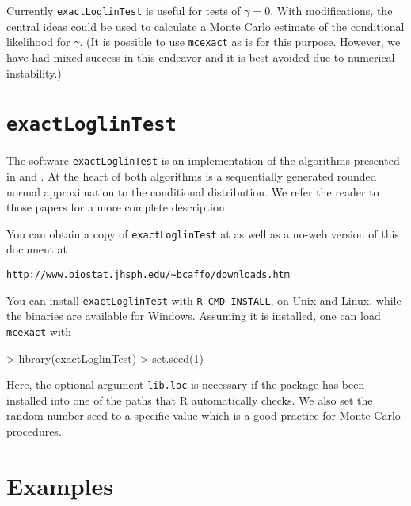 \documentclass[a4paper]{article}
\newcommand{\mcexact}{\texttt{mcexact} }
\begin{document}
Currently \texttt{exactLoglinTest} is useful for tests of $\gamma = 0$. With
modifications, the central ideas could be used to calculate a Monte
Carlo estimate of the conditional likelihood for $\gamma$. (It is
possible to use \mcexact as is for this purpose. However, we have had
mixed success in this endeavor and it is best avoided due to numerical
instability.)

\section{\texttt{exactLoglinTest}} 
The software \texttt{exactLoglinTest} is an implementation of the algorithms presented
in \cite{booth:butler:1999} and \cite{caffo:booth:2000}.  At the heart
of both algorithms is a sequentially generated rounded normal
approximation to the conditional distribution. We refer the reader
to those papers for a more complete description.

You can obtain a copy of \texttt{exactLoglinTest} at as well as a no-web \cite{leisch}
version of this document at
\begin{verbatim}
http://www.biostat.jhsph.edu/~bcaffo/downloads.htm
\end{verbatim}
You can install \texttt{exactLoglinTest} with \texttt{R CMD INSTALL}, on Unix and
Linux, while the binaries are available for Windows. Assuming it is
installed, one can load \mcexact with
\begin{Schunk}
\begin{Sinput}
> library(exactLoglinTest)
> set.seed(1)
\end{Sinput}
\end{Schunk}
Here, the optional argument \texttt{lib.loc} is necessary if
the package has been installed into one of the paths that R automatically
checks. We also set the random number seed to a specific value which is
a good practice for Monte Carlo procedures.

\section{Examples}
\end{document}
